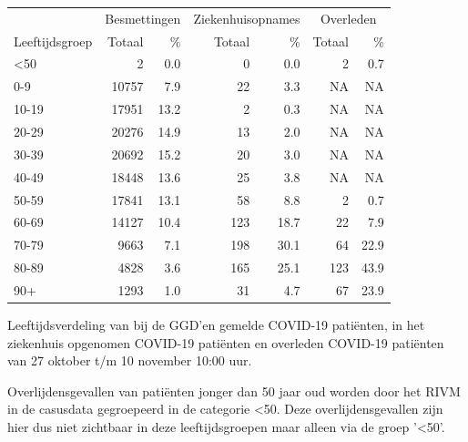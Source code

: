 \documentclass[
  english,
  man,floatsintext]{apa6}
\begin{document}
\begin{table}
\centering\begingroup\fontsize{11}{13}\selectfont

\begin{threeparttable}
\begin{tabular}{lrrrrrr}
\toprule
\multicolumn{1}{c}{ } & \multicolumn{2}{c}{Besmettingen} & \multicolumn{2}{c}{Ziekenhuisopnames} & \multicolumn{2}{c}{Overleden} \\
\cmidrule(l{3pt}r{3pt}){2-3} \cmidrule(l{3pt}r{3pt}){4-5} \cmidrule(l{3pt}r{3pt}){6-7}
Leeftijdsgroep & Totaal & \% & Totaal & \% & Totaal & \%\\
\midrule
<50 & 2 & 0.0 & 0 & 0.0 & 2 & 0.7\\
0-9 & 10757 & 7.9 & 22 & 3.3 & NA & NA\\
10-19 & 17951 & 13.2 & 2 & 0.3 & NA & NA\\
20-29 & 20276 & 14.9 & 13 & 2.0 & NA & NA\\
30-39 & 20692 & 15.2 & 20 & 3.0 & NA & NA\\
40-49 & 18448 & 13.6 & 25 & 3.8 & NA & NA\\
50-59 & 17841 & 13.1 & 58 & 8.8 & 2 & 0.7\\
60-69 & 14127 & 10.4 & 123 & 18.7 & 22 & 7.9\\
70-79 & 9663 & 7.1 & 198 & 30.1 & 64 & 22.9\\
80-89 & 4828 & 3.6 & 165 & 25.1 & 123 & 43.9\\
90+ & 1293 & 1.0 & 31 & 4.7 & 67 & 23.9\\
\bottomrule
\end{tabular}
\begin{tablenotes}
\item[1] Leeftijdsverdeling van bij de GGD’en gemelde COVID-19 patiënten, in het ziekenhuis opgenomen COVID-19 patiënten en overleden COVID-19 patiënten van 27 oktober t/m 10 november 10:00 uur.
\item[2] Overlijdensgevallen van patiënten jonger dan 50 jaar oud worden door het RIVM in de casusdata gegroepeerd in de categorie <50. Deze overlijdensgevallen zijn hier dus niet zichtbaar in deze leeftijdsgroepen maar alleen via de groep '<50'.
\end{tablenotes}
\end{threeparttable}
\endgroup{}
\end{table}

\newpage
\end{document}
